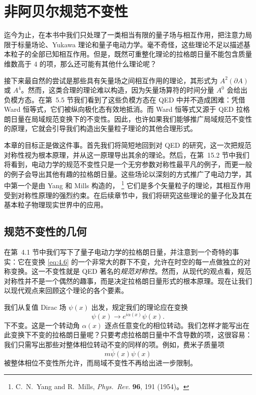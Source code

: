 \chapter{非阿贝尔规范不变性}

迄今为止，在本书中我们只处理了一类相当有限的量子场与相互作用，把注意力局限于标量场论、Yukawa 理论和量子电动力学。毫不奇怪，这些理论不足以描述基本粒子的全部已知相互作用。但是，既然可重整化理论的拉格朗日量不能包含质量维数高于 4 的项，那么还可能有其他什么理论呢？

接下来最自然的尝试是那些具有矢量场之间相互作用的理论，其形式为 $A^2(\partial A)$ 或 $A^4$。然而，这类合理的理论难以构造，因为矢量场算符的时间分量 $A^0$ 会给出负模方态。在第~5.5 节我们看到了这些负模方态在 QED 中并不造成困难：凭借 Ward 恒等式，它们被纵向极化态有效地抵消。而 Ward 恒等式又源于 QED 拉格朗日量在局域规范变换下的不变性。因此，也许如果我们能够推广局域规范不变性的原理，它就会引导我们构造出矢量粒子理论的其他合理形式。

本章的目标正是做这件事。首先我们将简短地回到对 QED 的研究，这一次把规范对称性视为根本原理，并从这一原理导出其余的理论。然后，在第~15.2 节中我们将看到，电动力学的规范不变性只是一个无穷参数对称性最平凡的例子，而更一般的例子会导出其他有趣的拉格朗日量。这些场论以深刻的方式推广了电动力学，其中第一个是由 Yang 和 Mills 构造的，%
\footnote{C.~N.~Yang and R.~Mills, \emph{Phys.\ Rev.} \textbf{96}, 191 (1954)。}
它们是多个矢量粒子的理论，其相互作用受到对称性原理的强烈约束。在后续章节中，我们将研究这些理论的量子化及其在基本粒子物理现实世界中的应用。

\section{规范不变性的几何}

在第~4.1 节中我们写下了量子电动力学的拉格朗日量，并注意到一个奇特的事实：它在变换 \eqref{eq:4.6} 的一个非常大的群下不变，允许在时空的每一点做独立的对称变换。这一不变性就是 QED 著名的\emph{规范对称性}。然而，从现代的观点看，规范对称性并不是一个偶然的趣事，而是决定拉格朗日量形式的根本原理。现在让我们以现代观点来回顾这个理论的各个要素。

我们从复值 Dirac 场 $\psi(x)$ 出发，规定我们的理论应在变换
\begin{equation}
  \psi(x) \to e^{i\alpha(x)}\psi(x) .
  \label{eq:15.1}
\end{equation}
下不变。这是一个转动角 $\alpha(x)$ 逐点任意变化的相位转动。我们怎样才能写出在此变换下不变的拉格朗日量呢？只要考虑拉格朗日量中不含导数的项，这很容易：我们只需写出那些对整体相位转动不变的同样的项。例如，费米子质量项
\begin{equation}
  m\bar{\psi}(x)\psi(x)
\end{equation}
被整体相位不变性所允许，而局域不变性不再给出进一步限制。

